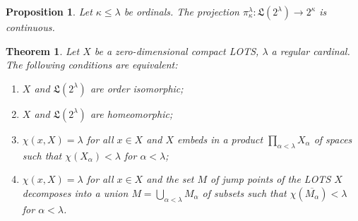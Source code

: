 \documentclass[10pt,a4paper]{amsart}
\newtheorem{proposition}{Proposition}
\newtheorem{theorem}{Theorem}
\def\B{2}
\def\al{\alpha}
\def\cl#1{\overline{#1}}
\def\ka{\kappa}
\def\la{\lambda}
\def\lex#1#2{\mathfrak{L}(#2^{#1})}
\def\lexab{\lex\la\B}
\begin{document}
\begin{proposition}\label{p:blex:2}
Let $\ka\leq \la$ be ordinals. The projection $\pi^\la_\ka: \lexab \to \B^\ka$ is continuous.
\end{proposition}

\begin{theorem}\label{t:blex:t1}
Let $X$ be a zero-dimensional compact LOTS, $\la$ a regular cardinal.
The following conditions are equivalent:
\begin{enumerate}
\item
$X$ and $\lexab$ are order isomorphic;
\item
$X$ and $\lexab$ are homeomorphic;
\item
$\chi(x,X)=\la$ for all $x\in X$ and $X$ embeds in a product $\prod_{\al<\la}X_\al$ of spaces such that $\chi(X_\al)<\la$ for $\al<\la$;
\item
$\chi(x,X)=\la$ for all $x\in X$ and the set $M$ of jump points of the LOTS $X$ decomposes into a union $M=\bigcup_{\al<\la} M_\al$ of subsets such that $\chi(\cl{M_\al})<\la$ for $\al<\la$.
\end{enumerate}
\end{theorem}
\end{document}
